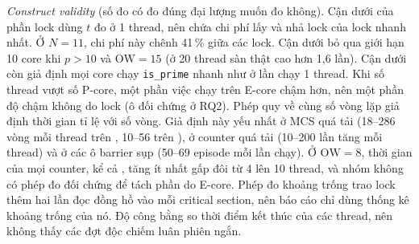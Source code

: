 \emph{Construct validity} (số đo có đo đúng đại lượng muốn đo không). Cận dưới của phần lock dùng $t$ đo ở 1 thread, nên chứa chi phí lấy và nhả
lock của lock nhanh nhất. Ở $N=11$, chi phí này chênh 41\,\% giữa các lock. Cận dưới bỏ qua giới hạn 10
core khi $p > 10$ và $\mathrm{OW} = 15$ (ở 20 thread sàn thật cao hơn 1,6 lần). Cận dưới còn giả định
mọi core chạy \texttt{is\_prime} nhanh như ở lần chạy 1 thread. Khi số thread vượt số P-core, một phần
việc chạy trên E-core chậm hơn, nên một phần độ chậm không do lock (ô đối chứng ở RQ2). Phép quy về cùng
số vòng lặp giả định thời gian tỉ lệ với số vòng. Giả định này yếu nhất ở MCS quá tải (18--286 vòng mỗi
thread trên , 10--56 trên ), ở counter  quá tải
(10--200 lần tăng mỗi thread) và ở các ô barrier sụp (50--69 episode mỗi lần chạy). Ở $\mathrm{OW}=8$,
thời gian của mọi counter, kể cả , tăng ít nhất gấp đôi từ 4 lên 10 thread, và nhóm không có
phép đo đối chứng để tách phần do E-core. Phép đo khoảng trống trao lock thêm hai lần đọc đồng hồ vào mỗi
critical section, nên báo cáo chỉ dùng thống kê khoảng trống của nó. Độ công bằng so thời điểm kết thúc
của các thread, nên không thấy các đợt độc chiếm luân phiên ngắn.

